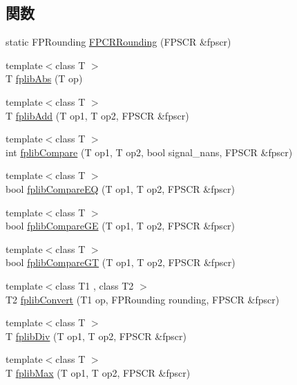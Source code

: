 \subsection*{関数}
\begin{DoxyCompactItemize}
\item 
static FPRounding \hyperlink{namespaceArmISA_ac3868bde2da2b545550e434e63ec639d}{FPCRRounding} (FPSCR \&fpscr)
\item 
{\footnotesize template$<$class T $>$ }\\T \hyperlink{namespaceArmISA_a888bd6abac5be37569c1be05c211950a}{fplibAbs} (T op)
\item 
{\footnotesize template$<$class T $>$ }\\T \hyperlink{namespaceArmISA_ab73a401eddcaa9e4dc9f2f288cdc2b7a}{fplibAdd} (T op1, T op2, FPSCR \&fpscr)
\item 
{\footnotesize template$<$class T $>$ }\\int \hyperlink{namespaceArmISA_a27a358780589526383b6db4e16b745cd}{fplibCompare} (T op1, T op2, bool signal\_\-nans, FPSCR \&fpscr)
\item 
{\footnotesize template$<$class T $>$ }\\bool \hyperlink{namespaceArmISA_ab1db62fd53aa91385df2d302e2624e66}{fplibCompareEQ} (T op1, T op2, FPSCR \&fpscr)
\item 
{\footnotesize template$<$class T $>$ }\\bool \hyperlink{namespaceArmISA_a1d57df170677640bd336eb5d18eb90bb}{fplibCompareGE} (T op1, T op2, FPSCR \&fpscr)
\item 
{\footnotesize template$<$class T $>$ }\\bool \hyperlink{namespaceArmISA_af8bf41a06c3abd7396711e548bceacd4}{fplibCompareGT} (T op1, T op2, FPSCR \&fpscr)
\item 
{\footnotesize template$<$class T1 , class T2 $>$ }\\T2 \hyperlink{namespaceArmISA_adc1596c73e52fbe5ef29e9bc8d8ba3c5}{fplibConvert} (T1 op, FPRounding rounding, FPSCR \&fpscr)
\item 
{\footnotesize template$<$class T $>$ }\\T \hyperlink{namespaceArmISA_a0060cb6f390a8bb09eac101b7cf152a3}{fplibDiv} (T op1, T op2, FPSCR \&fpscr)
\item 
{\footnotesize template$<$class T $>$ }\\T \hyperlink{namespaceArmISA_ad4280642b8a01e5575a1e42f3992f248}{fplibMax} (T op1, T op2, FPSCR \&fpscr)
\item 

\end{DoxyCompactItemize}

